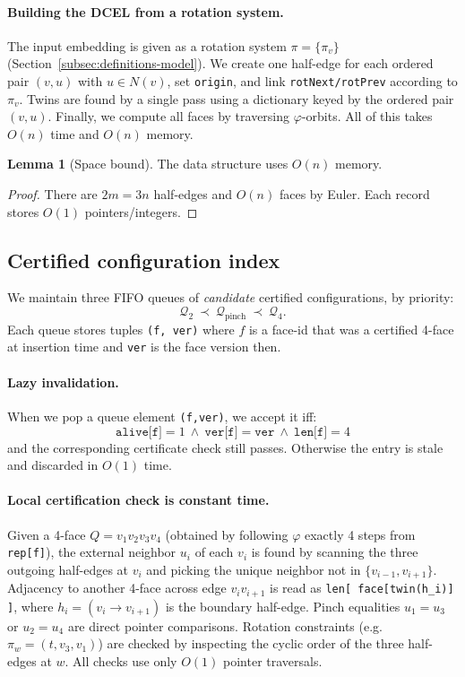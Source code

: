 \documentclass[12pt]{article}
\theoremstyle{definition}
\newtheorem{lemma}[theorem]{Lemma}
\begin{document}
\paragraph{Building the DCEL from a rotation system.}
The input embedding is given as a rotation system $\pi=\{\pi_v\}$ (Section~\ref{subsec:definitions-model}).
We create one half-edge for each ordered pair $(v,u)$ with $u\in N(v)$, set \texttt{origin}, and link
\texttt{rotNext/rotPrev} according to $\pi_v$.
Twins are found by a single pass using a dictionary keyed by the ordered pair $(v,u)$.
Finally, we compute all faces by traversing $\varphi$-orbits. All of this takes $O(n)$ time and $O(n)$ memory.

\begin{lemma}[Space bound]
\label{lem:space}
The data structure uses $O(n)$ memory.
\end{lemma}
\begin{proof}
There are $2m=3n$ half-edges and $O(n)$ faces by Euler. Each record stores $O(1)$ pointers/integers.
\end{proof}

\subsection{Certified configuration index}
\label{subsec:config-index}

We maintain three FIFO queues of \emph{candidate} certified configurations, by priority:
\[
\mathcal Q_2 \ \prec\ \mathcal Q_{\mathrm{pinch}}\ \prec\ \mathcal Q_4.
\]
Each queue stores tuples \texttt{(f, ver)} where $f$ is a face-id that was a certified 4-face at insertion time and
\texttt{ver} is the face version then.

\paragraph{Lazy invalidation.}
When we pop a queue element \texttt{(f,ver)}, we accept it iff:
\[
\texttt{alive[f]}=1 \ \wedge\ \texttt{ver[f]}=\texttt{ver} \ \wedge\ \texttt{len[f]}=4
\]
and the corresponding certificate check still passes. Otherwise the entry is stale and discarded in $O(1)$ time.

\paragraph{Local certification check is constant time.}
Given a 4-face $Q=v_1v_2v_3v_4$ (obtained by following $\varphi$ exactly 4 steps from \texttt{rep[f]}),
the external neighbor $u_i$ of each $v_i$ is found by scanning the three outgoing half-edges at $v_i$ and picking the
unique neighbor not in $\{v_{i-1},v_{i+1}\}$.
Adjacency to another 4-face across edge $v_iv_{i+1}$ is read as \texttt{len[ face[twin(h_i)] ]},
where $h_i=(v_i\to v_{i+1})$ is the boundary half-edge.
Pinch equalities $u_1=u_3$ or $u_2=u_4$ are direct pointer comparisons.
Rotation constraints (e.g.\ $\pi_w=(t,v_3,v_1)$) are checked by inspecting the cyclic order of the three half-edges at $w$.
All checks use only $O(1)$ pointer traversals.
\end{document}

